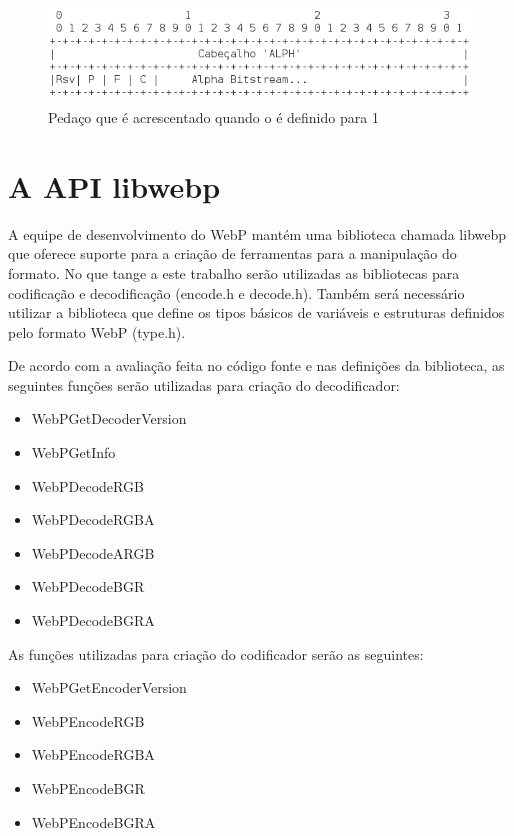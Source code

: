 \documentclass[espaco=simples,appendix=Name]{abnt}
\begin{document}
\begin{figure}[h]
  \centering
    \includegraphics[scale=0.4]{AlphaChunk.png}
  \caption{Pedaço que é acrescentado quando o  é definido para 1}
\end{figure}

\section{A API libwebp}

A equipe de desenvolvimento do WebP mantém uma biblioteca chamada libwebp que oferece suporte para a criação de ferramentas para a manipulação do formato. No que tange a este trabalho serão utilizadas as bibliotecas para codificação e decodificação (encode.h e decode.h). Também será necessário utilizar a biblioteca que define os tipos básicos de variáveis e estruturas definidos pelo formato WebP (type.h).

De acordo com a avaliação feita no código fonte e nas definições da biblioteca, as seguintes funções serão utilizadas para criação do decodificador:

\begin{itemize}
	\item WebPGetDecoderVersion
	\item WebPGetInfo
	\item WebPDecodeRGB
	\item WebPDecodeRGBA
	\item WebPDecodeARGB
	\item WebPDecodeBGR
	\item WebPDecodeBGRA
\end{itemize}

As funções utilizadas para criação do codificador serão as seguintes:

\begin{itemize}
	\item WebPGetEncoderVersion
	\item WebPEncodeRGB
	\item WebPEncodeRGBA
	\item WebPEncodeBGR
	\item WebPEncodeBGRA
\end{itemize}
\end{document}
